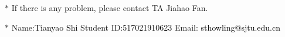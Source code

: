 \documentclass[12pt,a4paper]{article}
\theoremstyle{definition}
\begin{document}
\noindent

\noindent{}
\begin{center}
\footnotesize{\color{red}$*$ If there is any problem, please contact TA Jiahao Fan.}

\footnotesize{\color{blue}$*$ Name:{\textcolor{black}{Tianyao Shi}}  \quad Student ID:{\textcolor{black}{517021910623}} \quad Email: {\textcolor{black}{sthowling@sjtu.edu.cn}}}
\end{center}
\end{document}
